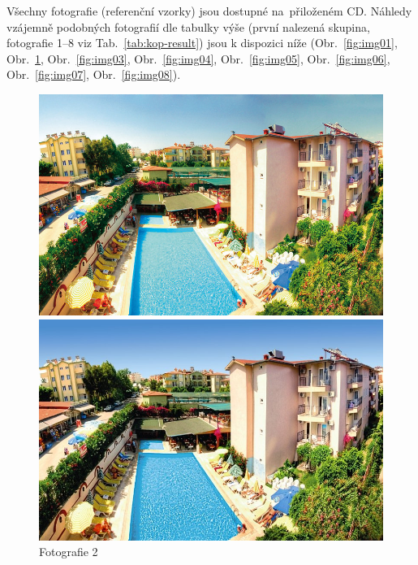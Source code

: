 
Všechny fotografie (referenční vzorky) jsou dostupné na~přiloženém CD. Náhledy vzájemně podobných fotografií dle tabulky výše (první nalezená skupina, fotografie 1--8 viz Tab.~\ref{tab:kop-result}) jsou k dispozici níže (Obr.~\ref{fig:img01}, Obr.~\ref{fig:img02}, Obr.~\ref{fig:img03}, Obr.~\ref{fig:img04}, Obr.~\ref{fig:img05}, Obr.~\ref{fig:img06}, Obr.~\ref{fig:img07}, Obr.~\ref{fig:img08}).

\begin{figure}[!htb]
	\includegraphics[width=\linewidth]{graphics/kop/aa01.png}
	\caption{Fotografie 1}\label{fig:img01}
	\endminipage\hfill
	\includegraphics[width=\linewidth]{graphics/kop/aa02.png}
	\caption{Fotografie 2}\label{fig:img02}
	\endminipage\hfill

\end{figure}
